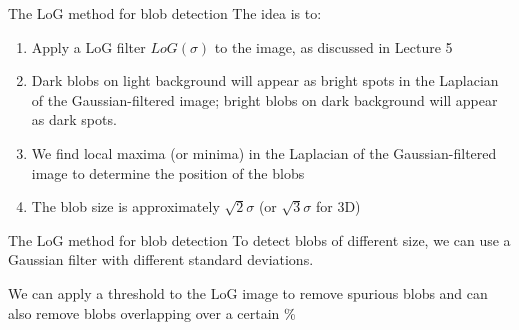 \documentclass[9pt, aspectratio=169]{beamer}
\begin{document}
\begin{frame}
    {The LoG method for blob detection}
    The idea is to:

    \begin{enumerate}
        \item Apply a LoG filter $LoG(\sigma)$ to the image, as discussed in Lecture 5
        \item Dark blobs on light background will appear as bright spots in the Laplacian of the Gaussian-filtered image; bright blobs on dark background will appear as dark spots.
              \pause
        \item We find local maxima (or minima) in the Laplacian of the Gaussian-filtered image to determine the position of the blobs
        \item The blob size is approximately $\sqrt{2}\sigma$ (or $\sqrt{3}\sigma$ for 3D)
    \end{enumerate}
\end{frame}

\begin{frame}
    {The LoG method for blob detection}
    To detect blobs of different size, we can use a Gaussian filter with different standard deviations.
    
    We can apply a threshold to the LoG image to remove spurious blobs and can also remove blobs overlapping over a certain \%


\end{frame}
\end{document}
